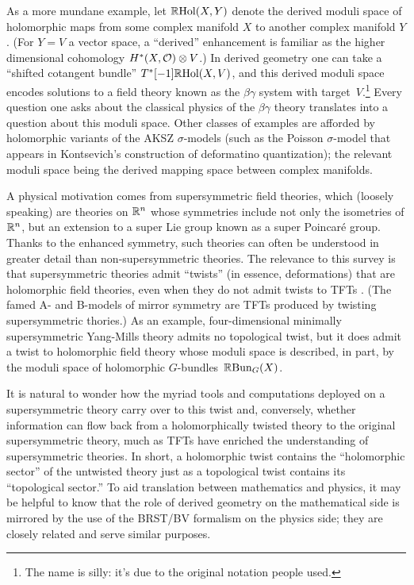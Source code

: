 \documentclass[11pt]{amsart}
\begin{document}
As a more mundane example, let $\mathbb R{\rm Hol}(X,Y)$ denote the derived moduli space of holomorphic maps from some complex manifold $X$ to another complex manifold $Y$.
(For $Y = V$ a vector space, a ``derived'' enhancement is familiar as the higher dimensional cohomology $H^*(X, \mathcal O) \otimes V$.)
In derived geometry one can take a ``shifted cotangent bundle'' $T^*[-1] \mathbb R{\rm Hol}(X,V)$,
and this derived moduli space encodes solutions to
a field theory known as the $\beta\gamma$ system with target~$V$.\footnote{The name is silly: it's due to the original notation people used.}
Every question one asks about the classical physics of the $\beta\gamma$ theory translates into a question about this moduli space.
Other classes of examples are afforded by holomorphic variants of the AKSZ $\sigma$-models (such as the Poisson $\sigma$-model that appears in Kontsevich's construction of deformatino quantization); 
the relevant moduli space being the derived mapping space between complex manifolds. 

A physical motivation comes from supersymmetric field theories, 
which (loosely speaking) are theories on $\mathbb R^n$ whose symmetries include not only the isometries of $\mathbb R^n$, but an extension to a super Lie group known as a super Poincar\'e group.
Thanks to the enhanced symmetry, such theories can often be understood in greater detail than non-supersymmetric theories.
The relevance to this survey is that supersymmetric theories admit ``twists'' (in essence, deformations) that are holomorphic field theories, 
even when they do not admit twists to TFTs \cite{CosHol}. 
(The famed A- and B-models of mirror symmetry are TFTs produced by twisting supersymmetric thories.)
As an example, four-dimensional minimally supersymmetric Yang-Mills theory admits no topological twist, 
but it does admit a twist to holomorphic field theory whose moduli space is described, in part, by the moduli space of holomorphic $G$-bundles~$\mathbb R {\rm Bun}_G(X)$. 

It is natural to wonder how the myriad tools and computations deployed on a supersymmetric theory carry over to this twist 
and, conversely, whether information can flow back from a holomorphically twisted theory to the original supersymmetric theory, 
much as TFTs have enriched the understanding of supersymmetric theories.
In short, a holomorphic twist contains the ``holomorphic sector'' of the untwisted theory just as a topological twist contains its ``topological sector.''
To aid translation between mathematics and physics, 
it may be helpful to know that the role of derived geometry on the mathematical side is mirrored by the use of the BRST/BV formalism on the physics side;
they are closely related and serve similar purposes.
\end{document}
